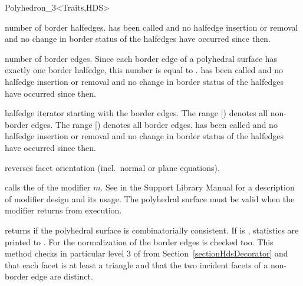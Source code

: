 \begin{ccClassTemplate}{Polyhedron_3<Traits,HDS>}
\begin{ccAdvanced}
    {number of border halfedges.
    \ccPrecond {} has been called and no
    halfedge insertion or removal and no change in border
    status of the halfedges have occurred since then.}

    {number of border edges. Since each border edge of a polyhedral
    surface has exactly one border halfedge,
    this number is equal to .
    \ccPrecond {} has been called and no
    halfedge insertion or removal and no change in border
    status of the halfedges have occurred since then.}

    {halfedge iterator starting with the border edges. The range
      [) denotes
    all non-border edges. The range
    [) denotes all
    border edges.
    \ccPrecond {} has been called and no
    halfedge insertion or removal and no change in border
    status of the halfedges have occurred since then.}

\end{ccAdvanced}


    {reverses facet orientation (incl.\ normal or plane equations).}

\begin{ccAdvanced}
    {calls the  of the modifier $m$. See
     in the Support Library Manual for a
    description of modifier design and its usage.
    \ccPrecond The polyhedral surface must be valid when the modifier
    returns from execution.}
\end{ccAdvanced}

   {returns  if the polyhedral surface is combinatorially 
    consistent. If  is , statistics are
    printed to . For  the normalization of the
    border edges is checked too. This method checks in particular level 3 of
     from
    Section~\ref{sectionHdsDecorator} and that each facet is at least
    a triangle and that the two incident facets of a non-border edge are
    distinct.}


\end{ccClassTemplate}
